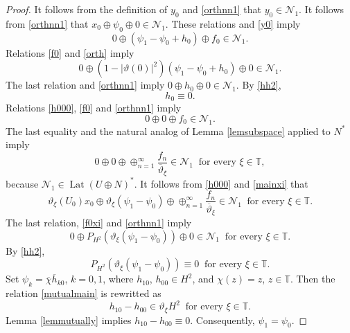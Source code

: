 \documentclass[a4paper,oneside,11pt]{amsart}
\numberwithin{equation}{section}
\theoremstyle{plain}
\theoremstyle{definition}
\begin{document}
\begin{proof}
It follows from the definition of $y_0$ and \eqref{orthnn1} that $y_0\in\mathcal N_1$. It follows from  \eqref{orthnn1} that 
$x_0\oplus\psi_0\oplus 0\in\mathcal N_1$. These relations and \eqref{y0} imply 
\begin{equation}\label{f0} 0\oplus (\psi_1-\psi_0+h_0)\oplus f_0\in\mathcal N_1.
\end{equation}
Relations \eqref{f0} and \eqref{orth} imply 
\begin{equation*} 0\oplus(1- |\vartheta(0)|^2)(\psi_1-\psi_0+h_0)\oplus 0\in\mathcal N_1.
\end{equation*} 
The last relation and \eqref{orthnn1} imply  $0\oplus h_0\oplus 0\in\mathcal N_1$. 
By \eqref{hh2},
\begin{equation}\label{h000} h_0\equiv 0.
\end{equation}
Relations \eqref{h000}, \eqref{f0} and \eqref{orthnn1} imply 
\begin{equation*} 0\oplus0\oplus f_0\in\mathcal N_1.
\end{equation*} 
The last equality and the natural analog of Lemma \ref{lemsubspace} applied to $N^*$ imply 
\begin{equation}\label{f0xi} 0\oplus 0\oplus\oplus_{n=1}^\infty\frac{f_n}{\overline\vartheta_\xi}
\in\mathcal N_1\ \text{ for every }\xi\in\mathbb T, 
\end{equation}
because $\mathcal N_1\in\operatorname{Lat}(U\oplus N)^*$. 
It follows from  \eqref{h000} and \eqref{mainxi} that 
\begin{equation*}\vartheta_\xi(U_0) x_0\oplus\vartheta_\xi (\psi_1-\psi_0)\oplus  
\oplus_{n=1}^\infty\frac{f_n}{\overline\vartheta_\xi}\in\mathcal N_1 \ \text{ for every }\xi\in\mathbb T.
\end{equation*}
The last relation, \eqref{f0xi} and \eqref{orthnn1} imply
\begin{equation*} 0\oplus  P_{H^2}(\vartheta_\xi(\psi_1-\psi_0))\oplus 0 \in\mathcal N_1 
\ \text{ for every }\xi\in\mathbb T.
\end{equation*}
By  \eqref{hh2}, 
\begin{equation}\label{mutualmain} P_{H^2}(\vartheta_\xi(\psi_1-\psi_0))\equiv 0  
\ \text{ for every }\xi\in\mathbb T.
\end{equation}
Set $\psi_k=\overline\chi\overline h_{k0}$, $k=0,1$, where $h_{10}$, $h_{00}\in H^2$,
 and $\chi(z)=z$, $z\in\mathbb T$. Then the relation \eqref{mutualmain} 
is rewritted as 
\begin{equation*} h_{10}-h_{00}\in \vartheta_\xi H^2\ \text{ for every }\xi\in\mathbb T.
\end{equation*}
Lemma \ref{lemmutually} implies $h_{10}-h_{00}\equiv 0$.  Consequently, $\psi_1=\psi_0$. 


\end{proof}
\end{document}
